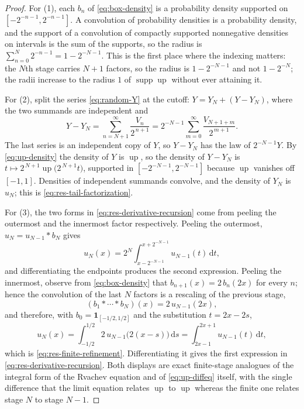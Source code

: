 \documentclass[11pt,oneside]{article}
\theoremstyle{definition}
\theoremstyle{remark}
\newcommand{\Up}{\operatorname{up}}
\newcommand{\dd}{\,\mathrm d}
\newcommand{\supp}{\operatorname{supp}}
\begin{document}
\begin{proof}
For (1), each $b_n$ of \eqref{eq:box-density} is a probability density supported on
$[-2^{-n-1},2^{-n-1}]$.  A convolution of probability densities is a probability density, and
the support of a convolution of compactly supported nonnegative densities on intervals is the
sum of the supports, so the radius is
$\sum_{n=0}^{N}2^{-n-1}=1-2^{-N-1}$.  This is the first place where the indexing matters: the
$N$th stage carries $N+1$ factors, so the radius is $1-2^{-N-1}$ and not $1-2^{-N}$; the
radii increase to the radius $1$ of $\supp\Up$ without ever attaining it.

For (2), split the series \eqref{eq:random-Y} at the cutoff:
$Y=Y_N+\left(Y-Y_N\right)$, where the two summands are independent and
\[
 Y-Y_N=\sum_{n=N+1}^{\infty}\frac{V_n}{2^{\,n+1}}
 =2^{-N-1}\sum_{m=0}^{\infty}\frac{V_{N+1+m}}{2^{\,m+1}}.
\]
The last series is an independent copy of $Y$, so $Y-Y_N$ has the law of $2^{-N-1}Y$.  By
\eqref{eq:up-density} the density of $Y$ is $\Up$, so the density of $Y-Y_N$ is
$t\mapsto2^{\,N+1}\Up\bigl(2^{\,N+1}t\bigr)$, supported in $[-2^{-N-1},2^{-N-1}]$ because
$\Up$ vanishes off $[-1,1]$.  Densities of independent summands convolve, and the density of
$Y_N$ is $u_N$; this is \eqref{eq:res-tail-factorization}.

For (3), the two forms in \eqref{eq:res-derivative-recursion} come from peeling the outermost
and the innermost factor respectively.  Peeling the outermost, $u_N=u_{N-1}*b_N$ gives
\[
 u_N(x)=2^{N}\int_{x-2^{-N-1}}^{x+2^{-N-1}}u_{N-1}(t)\dd t,
\]
and differentiating the endpoints produces the second expression.  Peeling the innermost,
observe from \eqref{eq:box-density} that $b_{n+1}(x)=2\,b_n(2x)$ for every $n$; hence the
convolution of the last $N$ factors is a rescaling of the previous stage,
\[
 \left(b_1*\cdots*b_N\right)(x)=2\,u_{N-1}(2x),
\]
and therefore, with $b_0=\mathbf 1_{[-1/2,1/2]}$ and the substitution $t=2x-2s$,
\[
 u_N(x)=\int_{-1/2}^{1/2}2\,u_{N-1}\bigl(2(x-s)\bigr)\dd s
 =\int_{2x-1}^{2x+1}u_{N-1}(t)\dd t,
\]
which is \eqref{eq:res-finite-refinement}.  Differentiating it gives the first expression in
\eqref{eq:res-derivative-recursion}.  Both displays are exact finite-stage analogues of the
integral form of the Rvachev equation and of \eqref{eq:up-diffeq} itself, with the single
difference that the limit equation relates $\Up$ to $\Up$ whereas the finite one relates
stage $N$ to stage $N-1$.


\end{proof}
\end{document}
